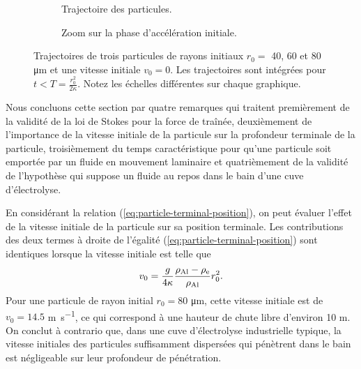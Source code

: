 \begin{figure}[h!]
 \begin{center}
    \begin{subfigure}[b]{0.49\textwidth}
      
      \caption{Trajectoire des particules.}
      \label{fig:particle-trajectories-a}
    \end{subfigure}
    \begin{subfigure}[b]{0.49\textwidth}
      
      \caption{Zoom sur la phase d'accélération initiale.}
      \label{fig:particle-trajectories-b}
    \end{subfigure}

    \caption{Trajectoires de trois particules de rayons initiaux $r_0 =
      $ 40, 60 et 80 \si{\micro\meter} et une vitesse initiale $v_0 =
      0$. Les trajectoires sont intégrées pour $t < T =
      \frac{r_0^2}{2\kappa}$. Notez les échelles différentes sur
      chaque graphique.}
    \label{fig:particle-trajectories}
  \end{center}
\end{figure}

Nous concluons cette section par quatre remarques qui traitent
premièrement de la validité de la loi de Stokes pour la force de traînée,
deuxièmement de l'importance de la vitesse initiale de la particule
sur la profondeur terminale de la particule, troisièmement du temps
caractéristique pour qu'une particule soit emportée par un fluide en
mouvement laminaire et quatrièmement de la validité de l'hypothèse qui
suppose un fluide au repos dans le bain d'une cuve d'électrolyse.
\clearpage

\begin{remarque}
  En considérant la relation (\ref{eq:particle-terminal-position}), on
  peut évaluer l'effet de la vitesse initiale de la particule sur sa
  position terminale. Les contributions des deux termes à droite de
  l'égalité (\ref{eq:particle-terminal-position}) sont identiques
  lorsque la vitesse initiale est telle que
  \begin{equation*}
    v_0 = \frac{g}{4\kappa}\frac{\rho_\mathrm{Al} -
      \rho_\mathrm{e}}{\rho_\mathrm{Al}} r_0^2.
  \end{equation*}
  Pour une particule de rayon initial $r_0 = \num{80}$
  \si{\micro\meter}, cette vitesse initiale est de $v_0 = \num{14.5}$
  \si{\meter\per\second}, ce qui correspond à une hauteur de chute
  libre d'environ \num{10} \si{\meter}. On conclut à contrario que,
  dans une cuve d'électrolyse industrielle typique, la vitesse
  initiales des particules suffisamment dispersées qui pénètrent dans
  le bain est négligeable sur leur profondeur de pénétration.
\end{remarque}

